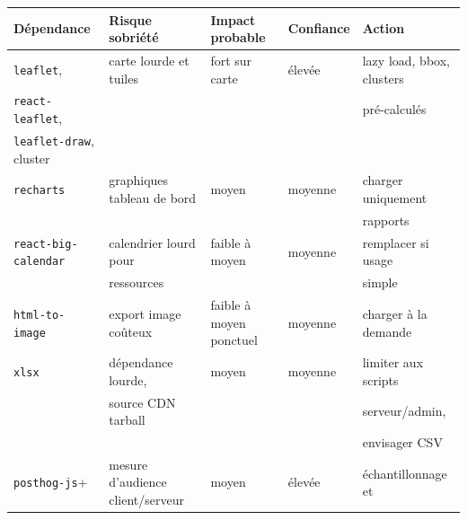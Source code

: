\documentclass[
  10pt,
  a4paper,
  DIV=11,
  numbers=noendperiod,
  oneside]{scrreprt}
\newcounter{none} %
\begin{document}
{\def\LTcaptype{none} %
\begin{longtable}[]{@{}
  >{\raggedright\arraybackslash}p{}
  >{\raggedright\arraybackslash}p{}
  >{\raggedright\arraybackslash}p{}
  >{\raggedright\arraybackslash}p{}
  >{\raggedright\arraybackslash}p{}@{}}
\toprule\noalign{}
\begin{minipage}[b]{\linewidth}\raggedright
Dépendance
\end{minipage} & \begin{minipage}[b]{\linewidth}\raggedright
Risque sobriété
\end{minipage} & \begin{minipage}[b]{\linewidth}\raggedright
Impact probable
\end{minipage} & \begin{minipage}[b]{\linewidth}\raggedright
Confiance
\end{minipage} & \begin{minipage}[b]{\linewidth}\raggedright
Action
\end{minipage} \\
\midrule\noalign{}
\endhead
\bottomrule\noalign{}
\endlastfoot
\texttt{leaflet}, & carte lourde et tuiles & fort sur carte & élevée &
lazy load, bbox, clusters \\
\texttt{react-leaflet}, & & & & pré-calculés \\
\texttt{leaflet-draw}, cluster & & & & \\
\texttt{recharts} & graphiques tableau de bord & moyen & moyenne &
charger uniquement \\
& & & & rapports \\
\texttt{react-big-calendar} & calendrier lourd pour & faible à moyen &
moyenne & remplacer si usage \\
& ressources & & & simple \\
\texttt{html-to-image} & export image coûteux & faible à moyen ponctuel
& moyenne & charger à la demande \\
\texttt{xlsx} & dépendance lourde, & moyen & moyenne & limiter aux
scripts \\
& source CDN tarball & & & serveur/admin, \\
& & & & envisager CSV \\
\texttt{posthog-js}+ & mesure d'audience client/serveur & moyen & élevée
& échantillonnage et \\

\end{longtable}}
\end{document}
